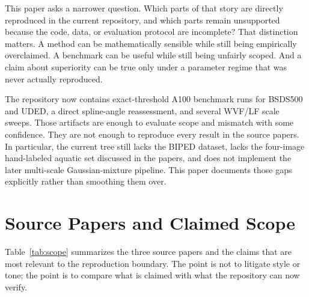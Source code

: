 \documentclass[conference]{IEEEtran}
\begin{document}
This paper asks a narrower question. Which parts of that story are directly reproduced in the current repository, and which parts remain unsupported because the code, data, or evaluation protocol are incomplete? That distinction matters. A method can be mathematically sensible while still being empirically overclaimed. A benchmark can be useful while still being unfairly scoped. And a claim about superiority can be true only under a parameter regime that was never actually reproduced.

The repository now contains exact-threshold A100 benchmark runs for BSDS500 and UDED, a direct spline-angle reassessment, and several WVF/LF scale sweeps. Those artifacts are enough to evaluate scope and mismatch with some confidence. They are not enough to reproduce every result in the source papers. In particular, the current tree still lacks the BIPED dataset, lacks the four-image hand-labeled aquatic set discussed in the papers, and does not implement the later multi-scale Gaussian-mixture pipeline. This paper documents those gaps explicitly rather than smoothing them over.

\section{Source Papers and Claimed Scope}

Table~\ref{tab:scope} summarizes the three source papers and the claims that are most relevant to the reproduction boundary. The point is not to litigate style or tone; the point is to compare what is claimed with what the repository can now verify.
\end{document}
